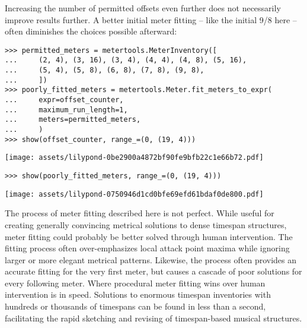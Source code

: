 \noindent Increasing the number of permitted offsets even further does not
necessarily improve results further. A better initial meter fitting -- like the
initial 9/8 here -- often diminishes the choices possible afterward:

\begin{comment}
<abjad>
permitted_meters = metertools.MeterInventory([
    (2, 4), (3, 16), (3, 4), (4, 4), (4, 8), (5, 16),
    (5, 4), (5, 8), (6, 8), (7, 8), (9, 8),
    ])
poorly_fitted_meters = metertools.Meter.fit_meters_to_expr(
    expr=offset_counter,
    maximum_run_length=1,
    meters=permitted_meters,
    )
show(offset_counter, range_=(0, (19, 4)))
show(poorly_fitted_meters, range_=(0, (19, 4)))
</abjad>
\end{comment}

\begin{abjadbookoutput}
\begin{singlespacing}
\vspace{-0.5\baselineskip}
\begin{lstlisting}
>>> permitted_meters = metertools.MeterInventory([
...     (2, 4), (3, 16), (3, 4), (4, 4), (4, 8), (5, 16),
...     (5, 4), (5, 8), (6, 8), (7, 8), (9, 8),
...     ])
>>> poorly_fitted_meters = metertools.Meter.fit_meters_to_expr(
...     expr=offset_counter,
...     maximum_run_length=1,
...     meters=permitted_meters,
...     )
>>> show(offset_counter, range_=(0, (19, 4)))
\end{lstlisting}
\noindent\texttt{[image: assets/lilypond-0be2900a4872bf90fe9bfb22c1e66b72.pdf]}
\begin{lstlisting}
>>> show(poorly_fitted_meters, range_=(0, (19, 4)))
\end{lstlisting}
\noindent\texttt{[image: assets/lilypond-0750946d1cd0bfe69efd61bdaf0de800.pdf]}
\end{singlespacing}
\end{abjadbookoutput}

\noindent The process of meter fitting described here is not perfect. While
useful for creating generally convincing metrical solutions to dense timespan
structures, meter fitting could probably be better solved through human
intervention. The fitting process often over-emphasizes local attack point
maxima while ignoring larger or more elegant metrical patterns. Likewise, the
process often provides an accurate fitting for the very first meter, but causes
a cascade of poor solutions for every following meter. Where procedural meter
fitting wins over human intervention is in speed. Solutions to enormous
timespan inventories with hundreds or thousands of timespans can be found in
less than a second, facilitating the rapid sketching and revising of
timespan-based musical structures.

